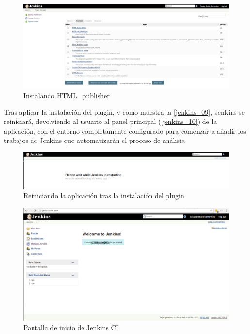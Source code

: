 \begin{figure}[htbp]
	\centering
	\includegraphics[width=1.0\linewidth]
	{desarrollo/figuras/jenkins_08.png}
	\caption{Instalando HTML\_publisher}
	\label{jenkins_08}
\end{figure}

Tras aplicar la instalación del plugin, y como muestra la \autoref{jenkins_09}, Jenkins se reiniciará, devolviendo al usuario al panel principal (\autoref{jenkins_10}) de la aplicación, con el entorno completamente configurado para comenzar a añadir los trabajos de Jenkins que automatizarán el proceso de análisis.

\begin{figure}[htbp]
	\centering
	\includegraphics[width=1.0\linewidth]
	{desarrollo/figuras/jenkins_09.png}
	\caption{Reiniciando la aplicación tras la instalación del plugin}
	\label{jenkins_09}
\end{figure}

\begin{figure}[htbp]
	\centering
	\includegraphics[width=1.0\linewidth]
	{desarrollo/figuras/jenkins_10.png}
	\caption{Pantalla de inicio de Jenkins \gls{CI}}
	\label{jenkins_10}
\end{figure}

